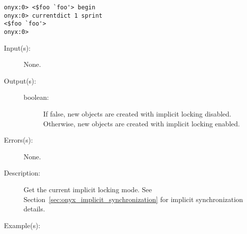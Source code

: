 \begin{description}
\begin{description}
\begin{verbatim}
onyx:0> <$foo `foo'> begin 
onyx:0> currentdict 1 sprint
<$foo `foo'>
onyx:0>
		\end{verbatim}
	\end{description}
\label{systemdict:currentlocking}
\item[{\onyxop{--}{currentlocking}{boolean}}: ]
	\begin{description}\item[]
	\item[Input(s): ] None.
	\item[Output(s): ]
		\begin{description}\item[]
		\item[boolean: ]
			If false, new objects are created with implicit locking
			disabled.  Otherwise, new objects are created with
			implicit locking enabled.
		\end{description}
	\item[Errors(s): ] None.
	\item[Description: ]
		Get the current implicit locking mode.  See
		Section~\ref{sec:onyx_implicit_synchronization} for implicit
		synchronization details.
	\item[Example(s): ]\begin{verbatim}


\end{verbatim}
\end{description}
\end{description}
